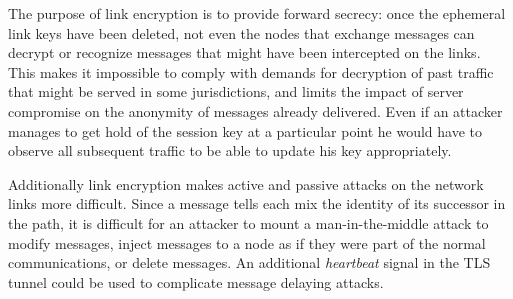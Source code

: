 \documentclass[final,inpress,inline]{ieee}
\begin{document}
%


%

The purpose of link encryption is to provide forward secrecy: 
once the ephemeral link keys have been deleted, not even the
nodes that exchange messages can decrypt or recognize messages
that might have been intercepted on the links. This makes it
impossible to comply with demands for decryption of past traffic 
that might be served in
some jurisdictions, and limits the impact of server compromise on the
anonymity 
of messages already delivered.
Even if an
attacker manages to get hold of the session key at a particular point
he would have to observe all subsequent traffic to be able to update
his key appropriately.

Additionally link encryption makes active and passive attacks on the
network links more difficult. Since a message tells each mix the identity
of its successor in the path, it is difficult for an attacker to
mount a man-in-the-middle attack to modify messages, inject messages
to a node as if they were part of the normal communications, or delete
messages.  An additional \emph{heartbeat} signal in the TLS tunnel
could be used to complicate message delaying attacks.
\end{document}
